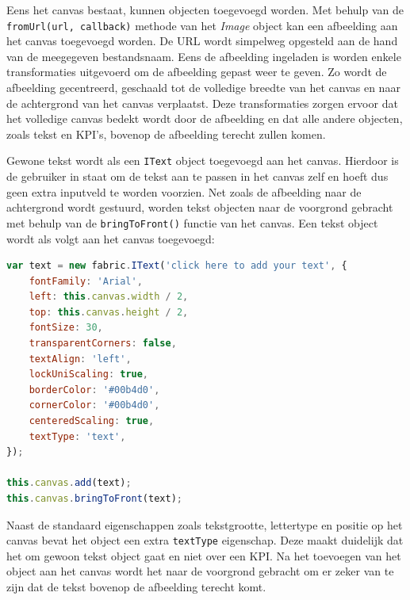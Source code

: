 Eens het canvas bestaat, kunnen objecten toegevoegd worden. Met behulp van de \texttt{fromUrl(url, callback)} methode van het \textit{Image} object kan een afbeelding aan het canvas toegevoegd worden. De URL wordt simpelweg opgesteld aan de hand van de meegegeven bestandsnaam. Eens de afbeelding ingeladen is worden enkele transformaties uitgevoerd om de afbeelding gepast weer te geven. Zo wordt de afbeelding gecentreerd, geschaald tot de volledige breedte van het canvas en naar de achtergrond van het canvas verplaatst. Deze transformaties zorgen ervoor dat het volledige canvas bedekt wordt door de afbeelding en dat alle andere objecten, zoals tekst en KPI's, bovenop de afbeelding terecht zullen komen. 


Gewone tekst wordt als een \texttt{IText} object toegevoegd aan het canvas. Hierdoor is de gebruiker in staat om de tekst aan te passen in het canvas zelf en hoeft dus geen extra inputveld te worden voorzien. Net zoals de afbeelding naar de achtergrond wordt gestuurd, worden tekst objecten naar de voorgrond gebracht met behulp van de \texttt{bringToFront()} functie van het canvas. Een tekst object wordt als volgt aan het canvas toegevoegd:

\begin{lstlisting}[language=javascript]
var text = new fabric.IText('click here to add your text', {
	fontFamily: 'Arial',
	left: this.canvas.width / 2,
	top: this.canvas.height / 2,
	fontSize: 30,
	transparentCorners: false,
	textAlign: 'left',
	lockUniScaling: true,
	borderColor: '#00b4d0',
	cornerColor: '#00b4d0',
	centeredScaling: true,
	textType: 'text',
});

this.canvas.add(text);
this.canvas.bringToFront(text);
\end{lstlisting}

Naast de standaard eigenschappen zoals tekstgrootte, lettertype en positie op het canvas bevat het object een extra \texttt{textType} eigenschap. Deze maakt duidelijk dat het om gewoon tekst object gaat en niet over een KPI. Na het toevoegen van het object aan het canvas wordt het naar de voorgrond gebracht om er zeker van te zijn dat de tekst bovenop de afbeelding terecht komt. 

